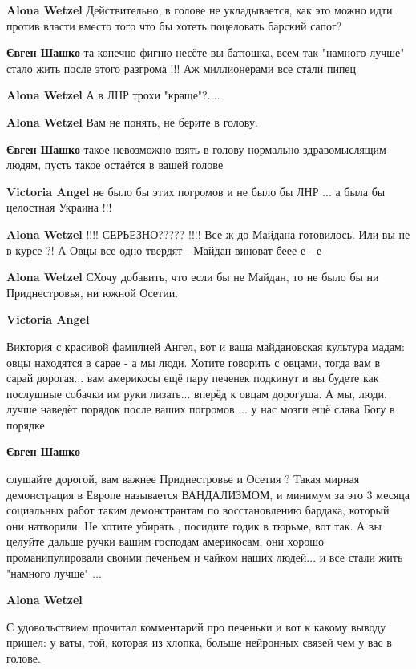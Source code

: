 \begin{itemize} %
\textbf{Alona Wetzel} Действительно, в голове не укладывается, как это можно идти против власти вместо того что бы хотеть поцеловать барский сапог?

\textbf{Євген Шашко} та конечно фигню несёте вы батюшка, всем так "намного лучше" стало жить после этого разгрома !!! Аж миллионерами все стали пипец

\textbf{Alona Wetzel} А в ЛНР трохи "краще"?....

\textbf{Alona Wetzel} Вам не понять, не берите в голову.

\textbf{Євген Шашко} такое невозможно взять в голову нормально здравомыслящим
людям, пусть такое остаётся в вашей голове

\textbf{Victoria Angel} не было бы этих погромов и не было бы ЛНР ... а была бы целостная Украина !!!

\textbf{Alona Wetzel} !!!! СЕРЬЕЗНО????? !!!! Все ж до Майдана готовилось. Или вы не в курсе ?! А Овцы все одно твердят - Майдан виноват беее-е - е

\textbf{Alona Wetzel} СХочу добавить, что если бы не Майдан, то не было бы ни Приднестровья, ни южной Осетии.

\textbf{Victoria Angel} 

Виктория с красивой фамилией Ангел, вот и ваша майдановская культура мадам:
овцы находятся в сарае - а мы люди. Хотите говорить с овцами, тогда вам в
сарай дорогая... вам америкосы ещё пару печенек подкинут и вы будете как
послушные собачки им руки лизать... вперёд к овцам дорогуша. А мы, люди, лучше
наведёт порядок после ваших погромов ... у нас мозги ещё слава Богу в порядке

\textbf{Євген Шашко} 

слушайте дорогой, вам важнее Приднестровье и Осетия ? Такая мирная демонстрация
в Европе называется ВАНДАЛИЗМОМ, и минимум за это 3 месяца социальных работ
таким демонстрантам по восстановлению бардака, который они натворили. Не
хотите убирать , посидите годик в тюрьме, вот так. А вы целуйте дальше ручки
вашим господам америкосам, они хорошо проманипулировали своими печеньем и
чайком наших людей... и все стали жить "намного лучше" ...

\textbf{Alona Wetzel} 

С удовольствием прочитал комментарий про печеньки и вот к какому выводу
пришел: у ваты, той, которая из хлопка, больше нейронных связей чем у вас в голове.


\end{itemize}
